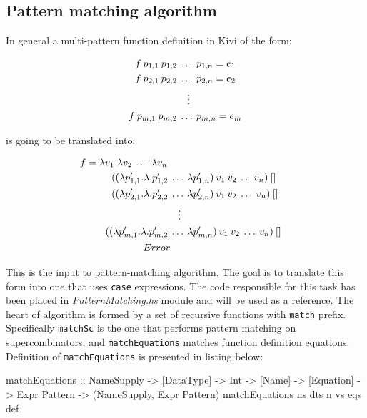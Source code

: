 \documentclass[12pt,a4paper]{report}
\begin{document}
\subsection{Pattern matching algorithm}
\label{sec:pattern_matching_algorithm}

In general a multi-pattern function definition in Kivi of the form:

\vspace{-0.2in}
\begin{align*}
f\:p_{1,1}\:p_{1,2}\:&\ldots\:p_{1,n} = e_{1} \\
f\:p_{2,1}\:p_{2,2}\:&\ldots\:p_{2,n} = e_{2} \\
                     &\mathrel{\makebox[\widthof{\ldots}]{\vdots}} \\
f\:p_{m,1}\:p_{m,2}\:&\ldots\:p_{m,n} = e_{m} \\
\end{align*}

is going to be translated into:

\vspace{-0.2in}
\begin{align*}
f = \lambda v_{1}.\lambda v_{2}\:\ldots\:\lambda v_{n}. \\
                ((\lambda p_{1,1}'.\lambda.p_{1,2}'\:&\ldots\:\lambda p_{1,n}')\:v_{1}\:v_{2}\:\ldots v_{n})\:[] \\
                ((\lambda p_{2,1}'.\lambda.p_{2,2}'\:&\ldots\:\lambda p_{2,n}')\:v_{1}\:v_{2}\:\ldots\:v_{n})\:[] \\
                                                     &\mathrel{\makebox[\widthof{\ldots}]{\vdots}} \\
                ((\lambda p_{m,1}'.\lambda.p_{m,2}'\:&\ldots\:\lambda p_{m,n}')\:v_{1}\:v_{2}\:\ldots\:v_{n})\:[] \\
                Error
\end{align*}

This is the input to pattern-matching algorithm. The goal is to translate this
form into one that uses \texttt{case} expressions. The code responsible for
this task has been placed in \textit{PatternMatching.hs} module and will be
used as a reference. The heart of algorithm is formed by a set of recursive
functions with \texttt{match} prefix. Specifically \texttt{matchSc} is the one
that performs pattern matching on supercombinators, and \texttt{matchEquations}
matches function definition equations. Definition of \texttt{matchEquations} is
presented in listing below:

\vspace*{0.2in}
\begin{code}[style=haskell]
  matchEquations :: NameSupply
                 -> [DataType]
                 -> Int
                 -> [Name]
                 -> [Equation]
                 -> Expr Pattern
                 -> (NameSupply, Expr Pattern)
  matchEquations ns dts n vs eqs def
\end{code}
\end{document}
